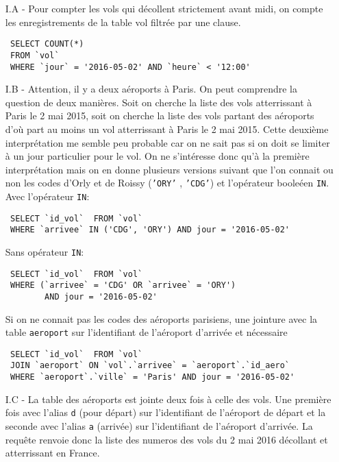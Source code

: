 \begin{itemize}
 \item [I.A - ] Pour compter les vols qui décollent strictement avant midi, on compte les enregistrements de la table vol filtrée par une clause.
\begin{verbatim}
 SELECT COUNT(*)
 FROM `vol`
 WHERE `jour` = '2016-05-02' AND `heure` < '12:00'
\end{verbatim}

\item[I.B - ] Attention, il y a deux aéroports à Paris.\newline
On peut comprendre la question de deux manières. Soit on cherche la liste des vols atterrissant à Paris le 2 mai 2015, soit on cherche la liste des vols partant des aéroports d'où part au moins un vol atterrissant à Paris le 2 mai 2015. Cette deuxième interprétation me semble peu probable car on ne sait pas si on doit se limiter à un jour particulier pour le vol.\newline
On ne s'intéresse donc qu'à la première interprétation mais on en donne plusieurs versions suivant que l'on connait ou non les codes d'Orly et de Roissy (\texttt{'ORY'} , \texttt{'CDG'}) et l'opérateur booleéen \texttt{IN}.\newline
Avec l'opérateur \texttt{IN}:
\begin{verbatim}
 SELECT `id_vol`  FROM `vol` 
 WHERE `arrivee` IN ('CDG', 'ORY') AND jour = '2016-05-02'
\end{verbatim}
Sans opérateur \texttt{IN}:
\begin{verbatim}
 SELECT `id_vol`  FROM `vol` 
 WHERE (`arrivee` = 'CDG' OR `arrivee` = 'ORY')
        AND jour = '2016-05-02'
\end{verbatim}
Si on ne connait pas les codes des aéroports parisiens, une jointure avec la table \texttt{aeroport} sur l'identifiant de l'aéroport d'arrivée et nécessaire
\begin{verbatim}
 SELECT `id_vol`  FROM `vol` 
 JOIN `aeroport` ON `vol`.`arrivee` = `aeroport`.`id_aero` 
 WHERE `aeroport`.`ville` = 'Paris' AND jour = '2016-05-02'
\end{verbatim}

\item[I.C - ] La table des aéroports est jointe deux fois à celle des vols. Une première fois avec l'alias \texttt{d} (pour départ) sur l'identifiant de l'aéroport de départ et la seconde avec l'alias \texttt{a} (arrivée) sur l'identifiant de l'aéroport d'arrivée.\newline
La requête renvoie donc la liste des numeros des vols du 2 mai 2016 décollant et atterrissant en France.


\end{itemize}
